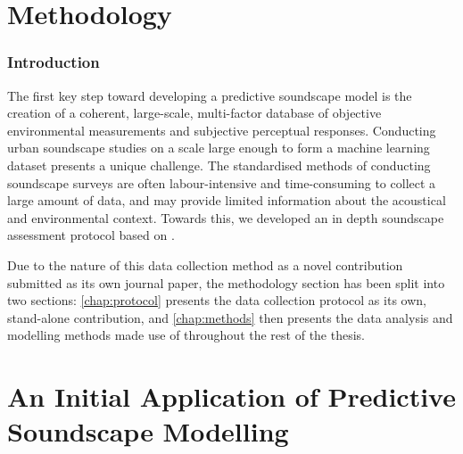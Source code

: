 \documentclass[twoside,fontsize=11pt,titlepage,chapterprefix=true
]{scrbook}
\begin{document}
\newpage
\glsnogroupskiptrue
\printglossary[style=long]

\newpage
\listoffigures

\newpage
\listoftables


\mainmatter





\part{Methodology}
\label{part:Methodology}

\section*{Introduction}
The first key step toward developing a predictive soundscape model is the creation of a coherent, large-scale, multi-factor database of objective environmental measurements and subjective perceptual responses. Conducting urban soundscape studies on a scale large enough to form a machine learning dataset presents a unique challenge. The standardised methods of conducting soundscape surveys \citep{ISO12913Part2} are often labour-intensive and time-consuming to collect a large amount of data, and may provide limited information about the acoustical and environmental context. Towards this, we developed an in depth soundscape assessment protocol based on \citet{ISO12913Part2}. 

Due to the nature of this data collection method as a novel contribution submitted as its own journal paper, the methodology section has been split into two sections: \cref{chap:protocol} presents the data collection protocol as its own, stand-alone contribution, and \cref{chap:methods} then presents the data analysis and modelling methods made use of throughout the rest of the thesis. 





\part{An Initial Application of Predictive Soundscape Modelling}
\label{part:Lockdown}
\end{document}
